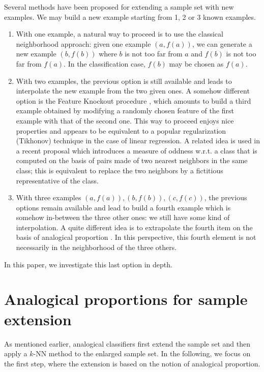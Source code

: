 \documentclass[article]{amsart}
\begin{document}
Several methods have been proposed for extending a sample set with new
examples. We may build a new example starting from
1, 2 or 3 known examples.
\begin{enumerate}
\item With one example, a natural way to proceed is to use the classical
  neighborhood approach: given one  example $(a,f(a))$, we can generate a new
    example $(b,f(b))$ where  $b$ is not too far from $a$ and $f(b)$ is not too
    far from $f(a)$. In the classification case, $f(b)$ may be chosen as
    $f(a)$.
\item With two examples, the previous option is still available and leads to
  interpolate the new example from the two given ones.  A somehow different
    option is the Feature Knockout procedure \cite{WolMar2004}, which amounts
    to build a third example obtained by modifying a randomly chosen feature
    of the first example with that of the second one.  This way to
    proceed enjoys nice properties and appears to be equivalent to a popular
    regularization (Tikhonov) technique in the case of linear regression.  A
    related idea is used in a recent proposal \cite{BouPraRicECAI2016} which
    introduces a measure of oddness w.r.t. a class that is computed on the
    basis of pairs made of two nearest neighbors in the same class; this is
    equivalent to replace the two neighbors by a fictitious representative of
    the class.

\item With three examples $(a,f(a)), (b,f(b)), (c,f(c))$, the previous options
  remain available and lead to build a fourth example which is somehow
    in-between the three other ones: we still have some kind of interpolation.
    A quite different idea is to extrapolate the fourth item on the basis of
    analogical proportion \cite{BayMouMicAnqECML2007}.  In this perspective,
    this fourth element is not necessarily in the neighborhood of the three
    others.
\end{enumerate}
In this paper, we investigate this last option in depth.

\section{Analogical proportions for sample extension}\label{analogy}

As mentioned earlier, analogical classifiers \cite{HugPraRicSerECAI2016} first
extend the sample set and then apply a $k$-NN method to the enlarged sample
set. In the following, we focus on the first step, where the extension is based
on the notion of analogical proportion.
\end{document}
